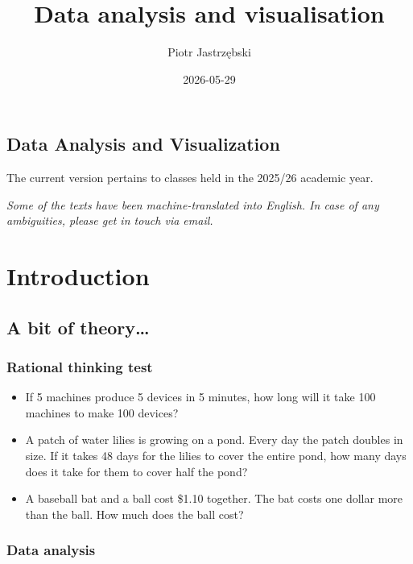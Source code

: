 \documentclass[
  english,
  letterpaper,
  DIV=11,
  numbers=noendperiod]{scrreprt}
\title{Data analysis and visualisation}
\author{Piotr Jastrzębski}
\date{2026-05-29}
\providecommand{\tightlist}{%
  \setlength{\itemsep}{0pt}\setlength{\parskip}{0pt}}
\renewcommand*\contentsname{Table of contents}
\newcommand\contentsname{Table of contents}
\begin{document}
\maketitle

\renewcommand*\contentsname{Table of contents}
{
\setcounter{tocdepth}{2}
\tableofcontents
}

\chapter{Data Analysis and
Visualization}\label{data-analysis-and-visualization}

The current version pertains to classes held in the 2025/26 academic
year.

\emph{Some of the texts have been machine-translated into English. In
case of any ambiguities, please get in touch via email.}

\part{Introduction}

\chapter{A bit of theory\ldots{}}\label{a-bit-of-theory}

\section{Rational thinking test}\label{rational-thinking-test}

\begin{itemize}
\tightlist
\item
  If 5 machines produce 5 devices in 5 minutes, how long will it take
  100 machines to make 100 devices?
\item
  A patch of water lilies is growing on a pond. Every day the patch
  doubles in size. If it takes 48 days for the lilies to cover the
  entire pond, how many days does it take for them to cover half the
  pond?
\item
  A baseball bat and a ball cost \$1.10 together. The bat costs one
  dollar more than the ball. How much does the ball cost?
\end{itemize}

\section{Data analysis}\label{data-analysis}
\end{document}
